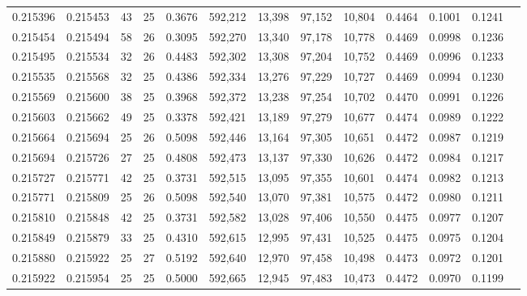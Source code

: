 \begin{tabular}{rrrrrrrrrrrrr}
0.215396 & 0.215453 &  43 &  25 &                                     0.3676 & 592,212 &  13,398 &  97,152 &  10,804 & 0.4464 & 0.1001 & 0.1241 \\
0.215454 & 0.215494 &  58 &  26 &                                     0.3095 & 592,270 &  13,340 &  97,178 &  10,778 & 0.4469 & 0.0998 & 0.1236 \\
0.215495 & 0.215534 &  32 &  26 &                                     0.4483 & 592,302 &  13,308 &  97,204 &  10,752 & 0.4469 & 0.0996 & 0.1233 \\
0.215535 & 0.215568 &  32 &  25 &                                     0.4386 & 592,334 &  13,276 &  97,229 &  10,727 & 0.4469 & 0.0994 & 0.1230 \\
0.215569 & 0.215600 &  38 &  25 &                                     0.3968 & 592,372 &  13,238 &  97,254 &  10,702 & 0.4470 & 0.0991 & 0.1226 \\
0.215603 & 0.215662 &  49 &  25 &                                     0.3378 & 592,421 &  13,189 &  97,279 &  10,677 & 0.4474 & 0.0989 & 0.1222 \\
0.215664 & 0.215694 &  25 &  26 &                                     0.5098 & 592,446 &  13,164 &  97,305 &  10,651 & 0.4472 & 0.0987 & 0.1219 \\
0.215694 & 0.215726 &  27 &  25 &                                     0.4808 & 592,473 &  13,137 &  97,330 &  10,626 & 0.4472 & 0.0984 & 0.1217 \\
0.215727 & 0.215771 &  42 &  25 &                                     0.3731 & 592,515 &  13,095 &  97,355 &  10,601 & 0.4474 & 0.0982 & 0.1213 \\
0.215771 & 0.215809 &  25 &  26 &                                     0.5098 & 592,540 &  13,070 &  97,381 &  10,575 & 0.4472 & 0.0980 & 0.1211 \\
0.215810 & 0.215848 &  42 &  25 &                                     0.3731 & 592,582 &  13,028 &  97,406 &  10,550 & 0.4475 & 0.0977 & 0.1207 \\
0.215849 & 0.215879 &  33 &  25 &                                     0.4310 & 592,615 &  12,995 &  97,431 &  10,525 & 0.4475 & 0.0975 & 0.1204 \\
0.215880 & 0.215922 &  25 &  27 &                                     0.5192 & 592,640 &  12,970 &  97,458 &  10,498 & 0.4473 & 0.0972 & 0.1201 \\
0.215922 & 0.215954 &  25 &  25 &                                     0.5000 & 592,665 &  12,945 &  97,483 &  10,473 & 0.4472 & 0.0970 & 0.1199 \\

\end{tabular}
